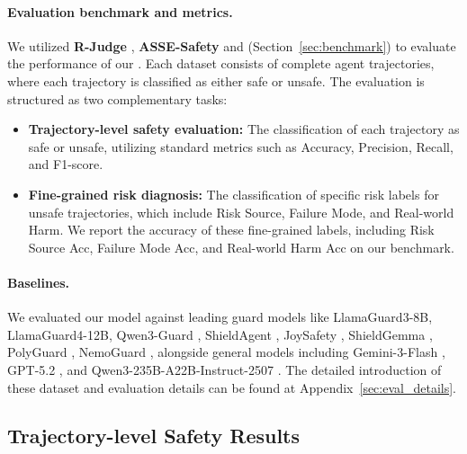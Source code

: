 \paragraph{Evaluation benchmark and metrics.} We utilized \textbf{R-Judge} \citep{yuan-etal-2024-r},  \textbf{ASSE-Safety} \citep{luo2025agentauditor} and \textbf{\toolBench{}} (Section~\ref{sec:benchmark}) to evaluate the performance of our \toolAG{}. Each dataset consists of complete agent trajectories, where each trajectory is classified as either safe or unsafe. The evaluation is structured as two complementary tasks:
\begin{itemize}
\item \textbf{Trajectory-level safety evaluation:} The classification of each trajectory as safe or unsafe, utilizing standard metrics such as Accuracy, Precision, Recall, and F1-score.
\item \textbf{Fine-grained risk diagnosis:} The classification of specific risk labels for unsafe trajectories, which include Risk Source, Failure Mode, and Real-world Harm. We report the accuracy of these fine-grained labels, including Risk Source Acc, Failure Mode Acc, and Real-world Harm Acc on our \toolBench{} benchmark.
\end{itemize}

\paragraph{Baselines.} We evaluated our model against leading guard models like LlamaGuard3-8B, LlamaGuard4-12B\citep{inan2023llama}, Qwen3-Guard \citep{qwen3guard2025},  ShieldAgent \citep{shieldagent2025}, JoySafety \citep{jd-opensource2025}, ShieldGemma \citep{shieldgemma2024}, PolyGuard \citep{poliguard2025}, NemoGuard \citep{nemo_guardrails2023}, alongside general models including Gemini-3-Flash \citep{googlecloud_gemini3flash_docs_2026}, GPT-5.2 \citep{openai_gpt52_2025}, and Qwen3-235B-A22B-Instruct-2507 \citep{qwen3}. The detailed introduction of these dataset and evaluation details can be found at Appendix~\ref{sec:eval_details}.

\subsection{Trajectory-level Safety Results}
\label{subsec:coarsegrained_results}







